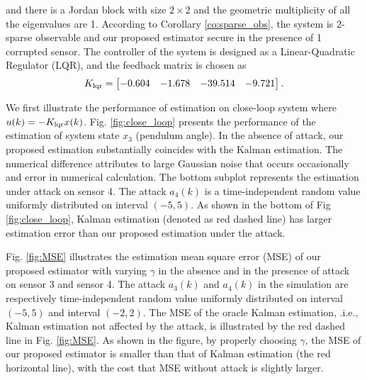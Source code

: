 \documentclass{ieeetrans}   %
\begin{document}
and there is a Jordan block with size $2\times 2$ and the geometric multiplicity of all the eigenvalues are 1.
According to Corollary \ref{co:sparse_obs}, the system is $2$-sparse observable and our proposed estimator secure in the presence of 1 corrupted sensor. 
The controller of the system is designed as a Linear-Quadratic Regulator (LQR), and the feedback matrix is chosen as 
$$K_{\rm lqr}=\begin{bmatrix}
	-0.604 & -1.678 & -39.514 & -9.721
 \end{bmatrix}.
$$
%
%
%


We first illustrate the performance of estimation on close-loop system where $u(k)=-K_{\rm lqr} x(k)$.
Fig. \ref{fig:close_loop} presents the performance of the estimation of system state $x_3$ (pendulum angle). In the absence of attack, our proposed estimation substantially coincides with the Kalman estimation. The numerical difference attributes to large Gaussian noise that occurs occasionally and error in numerical calculation.
The bottom subplot represents the estimation under attack on sensor 4.
The attack $a_4(k)$ is a time-independent random value uniformly distributed on interval $(-5,5)$. As shown in the bottom of Fig \ref{fig:close_loop}, Kalman estimation (denoted as red dashed line) has larger estimation error than our proposed estimation under the attack.

%	

Fig. \ref{fig:MSE} illustrates the estimation mean square error (MSE) of our proposed estimator with varying $\gamma$ in the absence and in the presence of attack on sensor 3 and sensor 4. 
The attack $a_3(k)$ and $a_4(k)$ in the simulation are respectively time-independent random value uniformly distributed on interval $(-5,5)$ and interval $(-2,2)$.
The MSE of the oracle Kalman estimation, .i.e., Kalman estimation not affected by the attack, is illustrated by the red dashed line in Fig. \ref{fig:MSE}.
As shown in the figure, by properly choosing $\gamma$, the MSE of our proposed estimator is smaller than that of Kalman estimation (the red horizontal line), with the cost that MSE without attack is slightly larger. 
\end{document}
